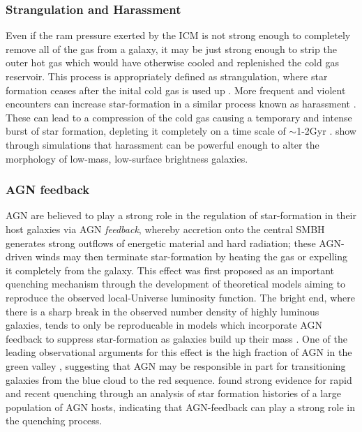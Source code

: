 \subsubsection{Strangulation and Harassment}

Even if the ram pressure exerted by the ICM is not strong enough to completely remove all of the gas from a galaxy, it may be just strong enough to strip the outer hot gas which would have otherwise cooled and replenished the cold gas reservoir. This process is appropriately defined as strangulation, where star formation ceases after the inital cold gas is used up \citep{Larson1980}. More frequent and violent encounters can increase star-formation in a similar process known as harassment \citep{Moore1996}. These can lead to a compression of the cold gas causing a temporary and intense burst of star formation, depleting it completely on a time scale of $\sim$1-2Gyr \citep{Kawata2007}. \citet{Moore1999} show through simulations that harassment can be powerful enough to alter the morphology of low-mass, low-surface brightness galaxies. 

\subsubsection{AGN feedback}
AGN are believed to play a strong role in the regulation of star-formation in their host galaxies via AGN \emph{feedback}, whereby accretion onto the central SMBH generates strong outflows of energetic material and hard radiation; these AGN-driven winds may then terminate star-formation by heating the gas or expelling it completely from the galaxy. This effect was first proposed as an important quenching mechanism through the development of theoretical models aiming to reproduce the observed local-Universe luminosity function. The bright end, where there is a sharp break in the observed number density of highly luminous galaxies, tends to only be reproducable in models which incorporate AGN feedback to suppress star-formation as galaxies build up their mass \citep{Benson2003, DiMatteo2005, Bower2006, Croton2006, Somerville2008}. One of the leading observational arguments for this effect is the high fraction of AGN in the green valley \citep{Martin2007a,Schawinski2010}, suggesting that AGN may be responsible in part for transitioning galaxies from the blue cloud to the red sequence. \citet{Smethurst2016} found strong evidence for rapid and recent quenching through an analysis of star formation histories of a large population of AGN hosts, indicating that AGN-feedback can play a strong role in the quenching process.  

